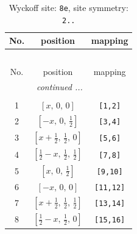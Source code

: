 \documentclass[fleqn,8pt]{jsarticle}
\begin{document}
\renewcommand{\arraystretch}{1.2}
\begin{longtable}{ccc}
\caption{Wyckoff site: {\tt 8e}, site symmetry: {\tt 2..}}
 \\
 \hline \hline
No. & position & mapping \\ \hline \endfirsthead

\multicolumn{2}{l}{\tablename\ \thetable{}} \\
 \hline \hline
No. & position & mapping \\ \hline \endhead

 \hline \hline
\multicolumn{2}{r}{\footnotesize\it continued ...} \\ \endfoot

 \hline \hline
\multicolumn{2}{r}{} \\ \endlastfoot

1 & $\left[ x,\, 0,\, 0 \right]$ & {\tt [1,2]} \\ \hline
2 & $\left[ - x,\, 0,\, \frac{1}{2} \right]$ & {\tt [3,4]} \\ \hline
3 & $\left[ x + \frac{1}{2},\, \frac{1}{2},\, 0 \right]$ & {\tt [5,6]} \\ \hline
4 & $\left[ \frac{1}{2} - x,\, \frac{1}{2},\, \frac{1}{2} \right]$ & {\tt [7,8]} \\ \hline
5 & $\left[ x,\, 0,\, \frac{1}{2} \right]$ & {\tt [9,10]} \\ \hline
6 & $\left[ - x,\, 0,\, 0 \right]$ & {\tt [11,12]} \\ \hline
7 & $\left[ x + \frac{1}{2},\, \frac{1}{2},\, \frac{1}{2} \right]$ & {\tt [13,14]} \\ \hline
8 & $\left[ \frac{1}{2} - x,\, \frac{1}{2},\, 0 \right]$ & {\tt [15,16]} \\
\end{longtable}
\renewcommand{\arraystretch}{1.2}
\end{document}
